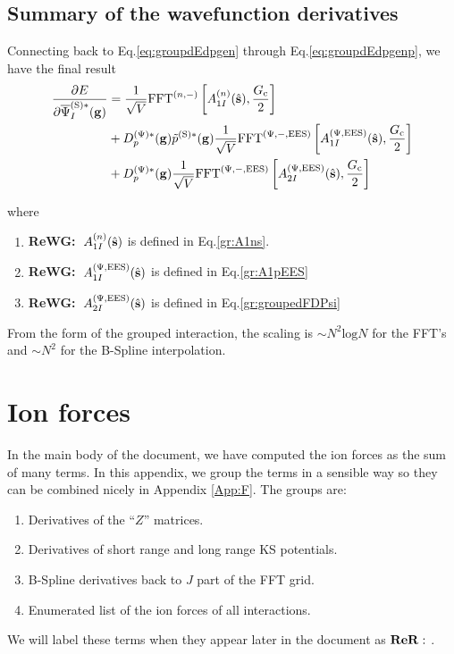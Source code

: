 \documentclass[paper=a4, fontsize=11pt]{article} %
\numberwithin{equation}{section} %
\numberwithin{figure}{section} %
\numberwithin{table}{section} %
\newcommand{\p}{\partial}
\newcommand{\bg}{{\bf{g}}}
\newcommand{\hs}{{\hat{\bf{s}}}}
\newcommand{\rS}{{\mathrm{S}}}
\newcommand{\rEES}{{\mathrm{EES}}}
\newcommand{\rl}{{\mathrm{log}}}
\newcommand{\psigsc}{{\overline \Psi_I^{(\rS)*}(\bg)}}
\newcommand{\hGc}{{\frac{G_{\mathrm{c}}}{2}}}
\newcommand{\Dpgc}{{D^{(\Psi)*}_p(\bg)}}
\newcommand{\FFTni}{{\mathrm{FFT}^{(n,-)}}}
\newcommand{\FFTpiEES}{{\mathrm{FFT}^{(\Psi,-,\rEES)}}}
\newcommand{\ReWG}{{{\bf ReWG:\ }}}
\newcommand{\ReR}{{{\bf ReR:\ }}}
\begin{document}
\subsection{Summary of the wavefunction derivatives}
Connecting back to Eq.\eqref{eq:groupdEdpgen} through Eq.\eqref{eq:groupdEdpgenp}, we have the final result
\begin{equation}
\begin{split}
\frac{\p E}{\p \psigsc} &=  \frac{1}{\sqrt{V}}\FFTni \left[A_{1I}^{(n)}(\hs),\hGc\right] \\
&+ \Dpgc \tilde p^{(\rS)*}(\bg) \frac{1}{\sqrt{V}} \FFTpiEES \left[A_{1I}^{(\Psi,\rEES)}(\hs),\hGc\right] \\
&+ \Dpgc \frac{1}{\sqrt{V}} \FFTpiEES \left[A_{2I}^{(\Psi,\rEES)}(\hs),\hGc\right] \\
\end{split}
\end{equation}

where
\begin{enumerate}
\item \ReWG $A_{1I}^{(n)}(\hs)$ is defined in Eq.\eqref{gr:A1ns}.
\item \ReWG $ A_{1I}^{(\Psi,\rEES)}(\hs)$ is defined in  Eq.\eqref{gr:A1pEES}
\item \ReWG $A_{2I}^{(\Psi,\rEES)}(\hs) $ is defined in Eq.\eqref{gr:groupedFDPsi}
\end{enumerate}

From the form of the grouped interaction, the scaling is $\sim N^2 \rl N$ for the FFT's and $\sim N^2$ for the B-Spline interpolation.

\newpage
\section{Ion forces}
\label{App:dEdR}
In the main body of the document, we have computed the ion forces as the sum of many terms. In this appendix, we group the terms in a sensible way so they can be combined nicely in Appendix  \ref{App:F}. The groups are:
\begin{enumerate}
\item Derivatives of the ``$Z$'' matrices.
\item Derivatives of short range and long range KS potentials.
\item B-Spline derivatives back to $J$ part of the FFT grid.
\item Enumerated list of the ion forces of all interactions.
\end{enumerate}
We will label these terms when they appear later in the document as $\ReR$.
\end{document}
